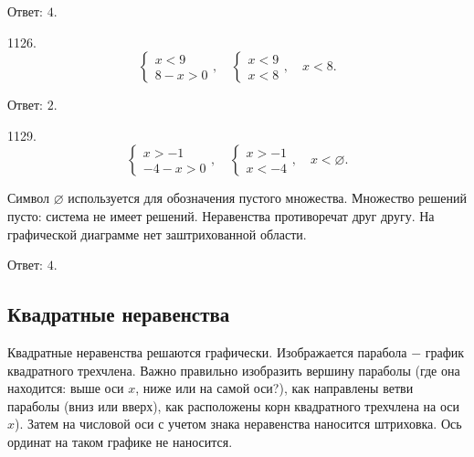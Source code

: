 \null \hspace*{\fill} Ответ: $4$. 

1126. $$\begin{cases}x<9\\8-x>0 \end{cases},\quad\begin{cases}x<9\\x<8 \end{cases},\quad x<8.$$                 

\begin{figure}[h!]
\end{figure}

\null \hspace*{\fill} Ответ: $2$. 

1129. $$\begin{cases}x>-1\\-4-x>0 \end{cases},\quad\begin{cases}x>-1\\x<-4 \end{cases},\quad x<\varnothing.$$                 
                 

Символ $\varnothing$ используется для обозначения пустого множества. Множество решений пусто: система не имеет решений. Неравенства противоречат друг другу. На графической диаграмме нет заштрихованной области.

\begin{figure}[h!]
\end{figure}

\null \hspace*{\fill} Ответ: $4$. 

\subsection{Квадратные неравенства}


Квадратные неравенства решаются графически. Изображается парабола $-$ график квадратного трехчлена. Важно правильно изобразить вершину параболы (где она находится: выше оси $x$, ниже или на самой оси?), как направлены ветви параболы (вниз или вверх), как  расположены корн квадратного трехчлена на оси $x$). Затем на числовой оси с учетом знака неравенства наносится штриховка. Ось ординат на таком графике не наносится.

